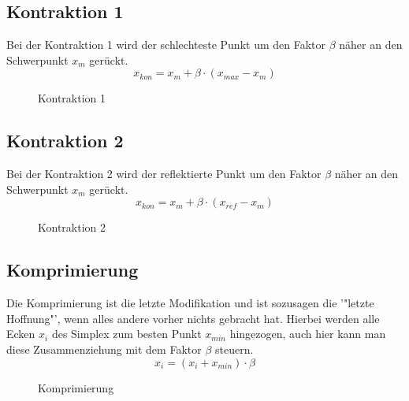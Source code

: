 \subsection{Kontraktion 1}
Bei der Kontraktion 1 wird der schlechteste Punkt um den Faktor $\beta$ näher an den Schwerpunkt $x_m$ gerückt. 
\begin{equation}
x_{kon} = x_{m} + \beta \cdot (x_{max}-x_{m})
\end{equation}

\begin{figure}[h]
	\centering
  	\caption{Kontraktion 1}%
	\label{fig:Kon1}%
\end{figure}

\subsection{Kontraktion 2}
Bei der Kontraktion 2 wird der reflektierte Punkt um den Faktor $\beta$ näher an den Schwerpunkt $x_m$ gerückt. 
\begin{equation}
x_{kon} = x_{m} + \beta \cdot (x_{ref}-x_{m})
\end{equation}

\begin{figure}[h]
	\centering
  	\caption{Kontraktion 2}%
	\label{fig:Kon2}%
\end{figure}
\newpage
\subsection{Komprimierung}
Die Komprimierung ist die letzte Modifikation und ist sozusagen die '"letzte Hoffnung"', wenn alles andere vorher nichts gebracht hat. Hierbei werden alle Ecken $x_i$ des Simplex zum besten Punkt $x_{min}$ hingezogen, auch hier kann man diese Zusammenziehung mit dem Faktor $\beta$ steuern.  
\begin{equation}
x_{i} = (x_i + x_{min}) \cdot \beta
\end{equation}

\begin{figure}[h]
	\centering
  	\caption{Komprimierung}%
	\label{fig:komp}%
\end{figure}
